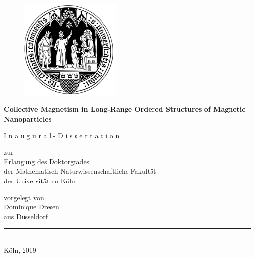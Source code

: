 \documentclass[12pt,
  paper=a4,
  a4paper,
 ]{scrbook}
\begin{document}
  \begin{center}
    \begin{figure}[H]
      \centering
      \includegraphics[width=5cm]{Universitaet_zu_Koeln-Siegel}
    \end{figure}
    \LARGE\textbf{Collective Magnetism in Long-Range Ordered Structures of Magnetic Nanoparticles}

    \vspace{2cm}

    \Large{I n a u g u r a l - D i s s e r t a t i o n } \\

    \vspace{2cm}

    \large{zur}\\
    \large{Erlangung des Doktorgrades}\\
    \large{der Mathematisch-Naturwissenschaftliche Fakult\"at}\\
    \large der Universit\"at zu K\"oln\\

    \vspace{2cm}

    \large{vorgelegt von}\\
    \large{Dominique Dresen}\\
    \large{aus D\"usseldorf}\\

    \vspace{2cm}

    \noindent\rule{14cm}{0.4pt}\\
    \normalsize{Köln, 2019}\\
  \end{center}
\end{document}
